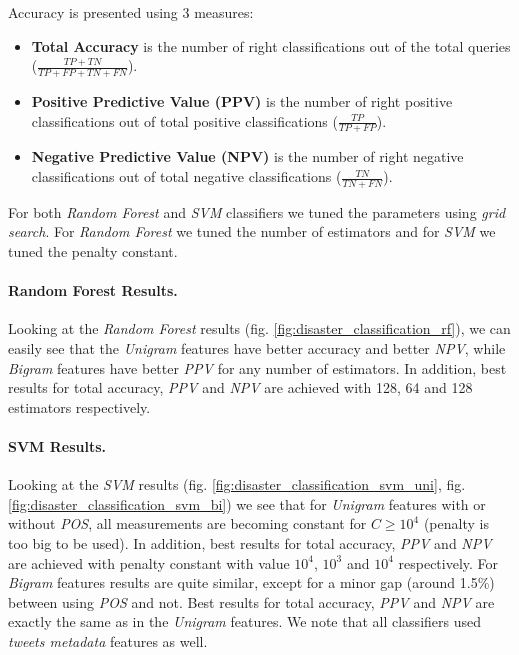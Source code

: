 \documentclass[letterpaper,twocolumn,10pt]{article}
\begin{document}
Accuracy is presented using 3 measures:

\begin{itemize}[noitemsep, nolistsep]
	\item \textbf{Total Accuracy} is the number of right classifications out of the total queries ($ \frac{TP + TN}{TP + FP + TN + FN } $).
	\item \textbf{Positive Predictive Value (PPV)} is the number of right positive classifications out of total positive classifications ($ \frac{TP}{TP + FP} $).
	\item \textbf{Negative Predictive Value (NPV)} is the number of right negative classifications out of total negative classifications ($ \frac{TN}{TN + FN} $).
\end{itemize}

For both \textit{Random Forest} and \textit{SVM} classifiers we tuned the parameters using \textit{grid search}. For \textit{Random Forest} we tuned the number of estimators and for \textit{SVM} we tuned the penalty constant.

\paragraph{Random Forest Results.} Looking at the \textit{Random Forest} results (fig. \ref{fig:disaster_classification_rf}), we can easily see that the \textit{Unigram} features have better accuracy and better \textit{NPV}, while \textit{Bigram} features have better \textit{PPV} for any number of estimators. In addition, best results for total accuracy, \textit{PPV} and \textit{NPV} are achieved with 128, 64 and 128 estimators respectively.

\paragraph{SVM Results.} Looking at the \textit{SVM} results (fig. \ref{fig:disaster_classification_svm_uni}, fig. \ref{fig:disaster_classification_svm_bi}) we see that for \textit{Unigram} features with or without \textit{POS}, all measurements are becoming constant for $ C \ge 10^4 $ (penalty is too big to be used). In addition, best results for total accuracy, \textit{PPV} and \textit{NPV} are achieved with penalty constant with value $ 10^4 $, $ 10^3 $  and $ 10^4 $ respectively. For \textit{Bigram} features results are quite similar, except for a minor gap (around 1.5\%) between using \textit{POS} and not. Best results for total accuracy, \textit{PPV} and \textit{NPV} are exactly the same as in the \textit{Unigram} features. We note that all classifiers used \textit{tweets metadata} features as well.
\end{document}

